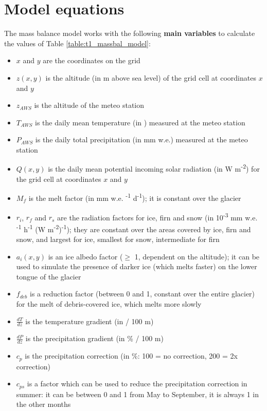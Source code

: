 \documentclass[15pt]{extarticle}
\begin{document}
\section{Model equations}
The mass balance model works with the following \textbf{main variables} to calculate the values of Table \ref{table:t1_massbal_model}:
\begin{itemize}
    \item $x$ and $y$ are the coordinates on the grid
    \item $z(x,y)$ is the altitude (in m above sea level) of the grid cell at coordinates $x$ and $y$
    \item $z_{AWS}$ is the altitude of the meteo station
    \item $T_{AWS}$ is the daily mean temperature (in \celsius) measured at the meteo station
    \item $P_{AWS}$ is the daily total precipitation (in mm w.e.) measured at the meteo station
    \item $Q(x,y)$ is the daily mean potential incoming solar radiation (in W m\textsuperscript{-2}) for the grid cell at coordinates $x$ and $y$
    \item $M_f$ is the melt factor (in mm w.e. \celsius\textsuperscript{-1} d\textsuperscript{-1}); it is constant over the glacier
    \item $r_i$, $r_f$ and $r_s$ are the radiation factors for ice, firn and snow (in 10\textsuperscript{-3} mm w.e. \celsius\textsuperscript{-1} h\textsuperscript{-1} (W m\textsuperscript{-2})\textsuperscript{-1}); they are constant over the areas covered by ice, firn and snow, and largest for ice, smallest for snow, intermediate for firn
    \item $a_i(x,y)$ is an ice albedo factor ($\geq$ 1, dependent on the altitude); it can be used to simulate the presence of darker ice (which melts faster) on the lower tongue of the glacier
    \item $f_{deb}$ is a reduction factor (between 0 and 1, constant over the entire glacier) for the melt of debris-covered ice, which melts more slowly
    \item $\frac{dT}{dz}$ is the temperature gradient (in \celsius / 100 m)
    \item $\frac{dP}{dz}$ is the precipitation gradient (in \% / 100 m)
    \item $c_p$ is the precipitation correction (in \%: 100 = no correction, 200 = 2x correction)
    \item $c_{ps}$ is a factor which can be used to reduce the precipitation correction in summer: it can be between 0 and 1 from May to September, it is always 1 in the other months

\end{itemize}
\end{document}
